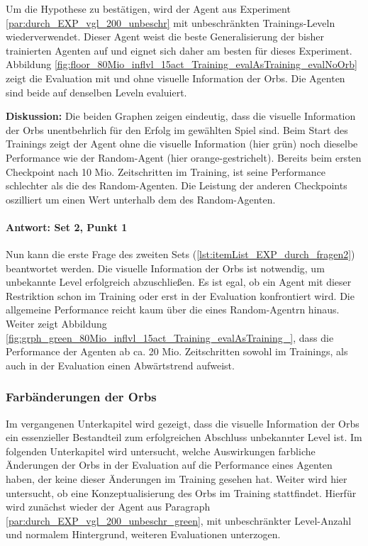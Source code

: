 
Um die Hypothese zu bestätigen, wird der Agent aus Experiment \ref{par:durch_EXP_vgl_200_unbeschr} mit unbeschränkten Trainings-Leveln wiederverwendet. Dieser Agent weist die beste Generalisierung der bisher trainierten Agenten auf und eignet sich daher am besten für dieses Experiment. Abbildung \ref{fig:floor_80Mio_inflvl_15act_Training_evalAsTraining_evalNoOrb} zeigt die Evaluation mit und ohne visuelle Information der Orbs. Die Agenten sind beide auf denselben Leveln evaluiert. 

\textbf{Diskussion:} Die beiden Graphen zeigen eindeutig, dass die visuelle Information der Orbs unentbehrlich für den Erfolg im gewählten Spiel sind. Beim Start des Trainings zeigt der Agent ohne die visuelle Information (hier grün) noch dieselbe Performance wie der Random-Agent (hier orange-gestrichelt). Bereits beim ersten Checkpoint nach 10 Mio. Zeitschritten im Training, ist seine Performance schlechter als die des Random-Agenten. Die Leistung der anderen Checkpoints oszilliert um einen Wert unterhalb dem des Random-Agenten. 

\paragraph{Antwort: Set 2, Punkt 1}
Nun kann die erste Frage des zweiten Sets (\ref{lst:itemList_EXP_durch_fragen2}) beantwortet werden. Die visuelle Information der Orbs ist notwendig, um unbekannte Level erfolgreich abzuschließen. Es ist egal, ob ein Agent mit dieser Restriktion schon im Training oder erst in der Evaluation konfrontiert wird. Die allgemeine Performance reicht kaum über die eines Random-Agentrn hinaus. Weiter zeigt Abbildung \ref{fig:grph_green_80Mio_inflvl_15act_Training_evalAsTraining_}, dass die Performance der Agenten ab ca. 20 Mio. Zeitschritten sowohl im Trainings, als auch in der Evaluation einen Abwärtstrend aufweist. 


\subsubsection{Farbänderungen der Orbs}\label{sub_absch_EXP_durch_farbÄnderungen}
Im vergangenen Unterkapitel wird gezeigt, dass die visuelle Information der Orbs  ein essenzieller Bestandteil zum erfolgreichen Abschluss unbekannter Level ist. Im folgenden Unterkapitel wird untersucht, welche Auswirkungen farbliche Änderungen der Orbs in der Evaluation auf die Performance eines Agenten haben, der keine dieser Änderungen im Training gesehen hat. Weiter wird hier untersucht, ob eine Konzeptualisierung des Orbs im Training stattfindet. Hierfür wird zunächst wieder der Agent aus Paragraph \ref{par:durch_EXP_vgl_200_unbeschr_green}, mit unbeschränkter Level-Anzahl und normalem Hintergrund, weiteren Evaluationen unterzogen. 


